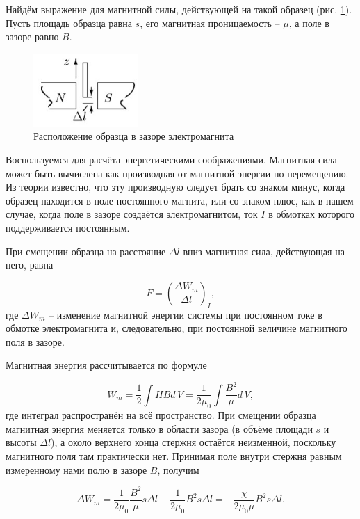 \documentclass[a4paper,12pt]{article} %
\begin{document}
Найдём выражение для магнитной силы, действующей на такой образец (рис. \ref{pic:2}). Пусть площадь образца равна $ s $, его магнитная проницаемость -- $ \mu $, а поле в зазоре равно $ B $.

\begin{figure}
	\includegraphics[width=4cm]{Screenshot_2.jpg}
	\caption{Расположение образца в зазоре электромагнита}
	\label{pic:2}
\end{figure}

Воспользуемся для расчёта энергетическими соображениями. Магнитная сила может быть вычислена как производная от магнитной энергии по перемещению. Из теории известно, что эту производную следует брать со знаком минус, когда образец находится в поле постоянного магнита, или со знаком плюс, как в нашем случае, когда поле в зазоре создаётся электромагнитом, ток $ I $ в обмотках которого поддерживается постоянным.

При смещении образца на расстояние $ \Delta l $ вниз магнитная сила, действующая на него, равна

\begin{equation}\label{1}
F = \left(\frac{\Delta W_m}{\Delta l}\right)_I,
\end{equation}
где $ \Delta W_m $ -- изменение магнитной энергии системы при постоянном токе
в обмотке электромагнита и, следовательно, при постоянной величине
магнитного поля в зазоре.

Магнитная энергия рассчитывается по формуле

\begin{equation}\label{2}
W_m=\frac{1}{2}\int HBd\,V = \frac{1}{2\mu_0}\int\frac{B^2}{\mu}d\,V,
\end{equation}
где интеграл распространён на всё пространство. При смещении образца магнитная энергия меняется только в области зазора (в объёме площади $ s $ и высоты $ \Delta l $), а около верхнего конца стержня остаётся неизменной, поскольку магнитного поля там практически нет. Принимая поле внутри стержня равным измеренному нами полю в зазоре $ B $, получим

\begin{equation}\label{3}
\Delta W_m=\frac{1}{2\mu_0}\frac{B^2}{\mu}s\Delta l - \frac{1}{2\mu_0}B^2 s\Delta l = -\frac{\chi}{2\mu_0\mu}B^2s\Delta l.
\end{equation}
\end{document}
